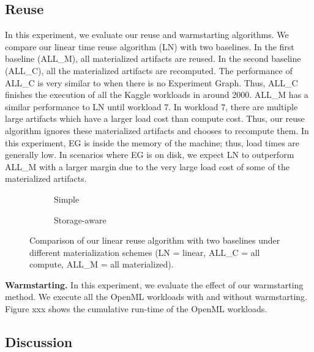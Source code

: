 \subsection{Reuse}
In this experiment, we evaluate our reuse and warmstarting algorithms. 
We compare our linear time reuse algorithm (LN) with two baselines.
In the first baseline (ALL\_M), all materialized artifacts are reused.
In the second baseline (ALL\_C), all the materialized artifacts are recomputed.
The performance of ALL\_C is very similar to when there is no Experiment Graph.
Thus, ALL\_C finishes the execution of all the Kaggle workloads in around 2000.
ALL\_M has a similar performance to LN until workload 7.
In workload 7, there are multiple large artifacts which have a larger load cost than compute cost.
Thus, our reuse algorithm ignores these materialized artifacts and chooses to recompute them.
In this experiment, EG is inside the memory of the machine; thus, load times are generally low.
In scenarios where EG is on disk, we expect LN to outperform ALL\_M with a larger margin due to the very large load cost of some of the materialized artifacts.
\begin{figure}
\begin{subfigure}[b]{0.5\linewidth}
\centering
 \resizebox{\columnwidth}{!}{%
%
}
\caption{Simple}
\end{subfigure}%
\begin{subfigure}[b]{0.5\linewidth}
\centering
 \resizebox{\columnwidth}{!}{%
%
}

\caption{Storage-aware}
\end{subfigure}
\caption{Comparison of our linear reuse algorithm with two baselines under different materialization schemes (LN = linear, ALL\_C = all compute, ALL\_M = all materialized). }
\end{figure}

\textbf{Warmstarting.}
In this experiment, we evaluate the effect of our warmstarting method.
We execute all the OpenML workloads with and without warmstarting.
Figure xxx shows the cumulative run-time of the OpenML workloads.
\subsection{Discussion}
